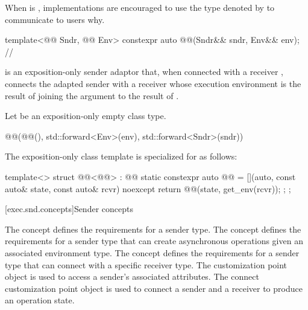 \recommended
When  is ,
implementations are encouraged to use the type
denoted by 
to communicate to users why.

\begin{itemdecl}
template<@@ Sndr, @@ Env>
  constexpr auto @@(Sndr&& sndr, Env&& env);     // \expos
\end{itemdecl}

\begin{itemdescr}
\pnum
{} is an exposition-only sender adaptor that,
when connected with a receiver ,
connects the adapted sender with a receiver
whose execution environment is the result of
joining the  argument 
to the result of .

\pnum
Let  be an exposition-only empty class type.

\pnum
\returns
\begin{codeblock}
@@(@@(), std::forward<Env>(env), std::forward<Sndr>(sndr))
\end{codeblock}

\pnum
\remarks
The exposition-only class template 
is specialized for  as follows:
\begin{codeblock}
template<>
struct @@<@@> : @@ {
  static constexpr auto @@ =
    [](auto, const auto& state, const auto& rcvr) noexcept {
      return @@(state, get_env(rcvr));
    };
};
\end{codeblock}
\end{itemdescr}

[exec.snd.concepts]{Sender concepts}

\pnum
The  concept defines
the requirements for a sender type.
The  concept defines
the requirements for a sender type
that can create asynchronous operations given an associated environment type.
The  concept defines
the requirements for a sender type
that can connect with a specific receiver type.
The  customization point object is used to access
a sender's associated attributes.
The connect customization point object is used to connect
a sender and a receiver to produce an operation state.

